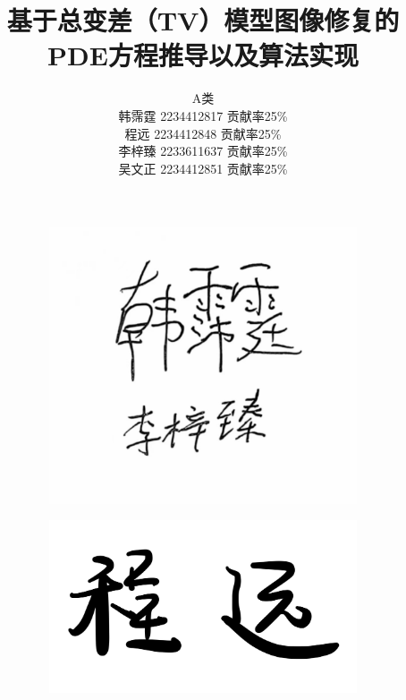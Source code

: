 \documentclass[UTF8]{ctexart}
\begin{document}
\title{\vspace{0cm}基于总变差（TV）模型图像修复的PDE方程推导以及算法实现}
\author{A类\\韩霈霆 2234412817 贡献率25\%\\程远 2234412848 贡献率25\%\\李梓臻 2233611637 贡献率25\%\\ 吴文正 2234412851 贡献率25\%}


\date{}
\maketitle
\begin{figure}[H]
    \centering
    \begin{subfigure}[b]{0.3\textwidth}
        \includegraphics[width=\textwidth]{hpt_lzz.jpg} %
    \end{subfigure}
    \hfill
    \begin{subfigure}[b]{0.3\textwidth}
        \includegraphics[width=\textwidth]{cy.jpg} %

\end{subfigure}
\end{figure}
\end{document}
